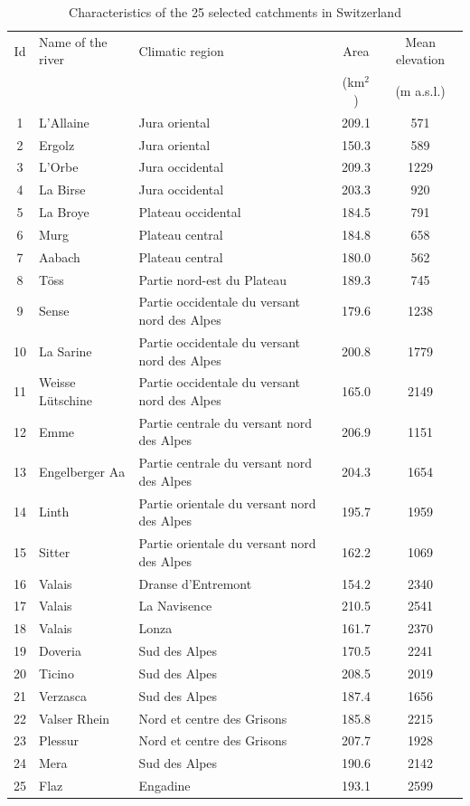 \documentclass[draft]{agujournal2019}
\begin{document}
\begin{table}
	\centering
	\caption{Characteristics of the 25 selected catchments in Switzerland}
	\begin{tabular}{cllcc}
		\hline 
		Id & Name of the river & Climatic region & Area & Mean elevation \\
		& & & (km$^2$) & (m a.s.l.) \\
		\hline 
		1 & L'Allaine & Jura oriental & 209.1 & 571 \\
		2 & Ergolz & Jura oriental & 150.3 & 589 \\
		3 & L'Orbe & Jura occidental & 209.3 & 1229 \\
		4 & La Birse & Jura occidental & 203.3 & 920 \\
		5 & La Broye & Plateau occidental & 184.5 & 791 \\
		6 & Murg & Plateau central & 184.8 & 658 \\
		7 & Aabach & Plateau central & 180.0 & 562 \\
		8 & T\"oss & Partie nord-est du Plateau & 189.3 & 745 \\
		9 & Sense & Partie occidentale du versant nord des Alpes & 179.6 & 1238 \\
		10 & La Sarine & Partie occidentale du versant nord des Alpes & 200.8 & 1779 \\
		11 & Weisse L\"utschine & Partie occidentale du versant nord des Alpes & 165.0 & 2149 \\
		12 & Emme & Partie centrale du versant nord des Alpes & 206.9 & 1151 \\
		13 & Engelberger Aa & Partie centrale du versant nord des Alpes & 204.3 & 1654 \\
		14 & Linth & Partie orientale du versant nord des Alpes & 195.7 & 1959 \\
		15 & Sitter & Partie orientale du versant nord des Alpes & 162.2 & 1069 \\
		16 & Valais & Dranse d'Entremont & 154.2 & 2340 \\
		17 & Valais & La Navisence & 210.5 & 2541 \\
		18 & Valais & Lonza & 161.7 & 2370 \\
		19 & Doveria & Sud des Alpes & 170.5 & 2241 \\
		20 & Ticino & Sud des Alpes & 208.5 & 2019 \\
		21 & Verzasca & Sud des Alpes & 187.4 & 1656 \\
		22 & Valser Rhein & Nord et centre des Grisons & 185.8 & 2215 \\
		23 & Plessur & Nord et centre des Grisons & 207.7 & 1928 \\
		24 & Mera & Sud des Alpes & 190.6 & 2142 \\
		25 & Flaz & Engadine & 193.1 & 2599 \\
		\hline 
	\end{tabular} 
	\label{catchments}
\end{table}
\end{document}
